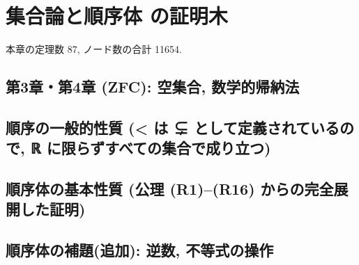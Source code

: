 \chapter{集合論と順序体 の証明木}
本章の定理数 87, ノード数の合計 11654.

\section{第3章・第4章 (ZFC): 空集合, 数学的帰納法}




\section{順序の一般的性質 (< は ⊊ として定義されているので, ℝ に限らずすべての集合で成り立つ)}








\section{順序体の基本性質 (公理 (R1)–(R16) からの完全展開した証明)}




































\section{順序体の補題(追加): 逆数, 不等式の操作}



























